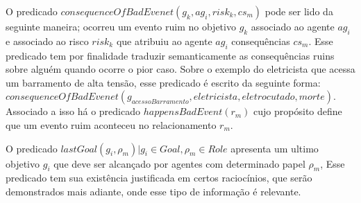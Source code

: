 O predicado $consequenceOfBadEvenet(g_k, ag_i,risk_k,cs_m)$ pode ser lido da seguinte maneira; ocorreu um evento ruim no 
objetivo $g_k$ associado ao agente $ag_i$ e associado ao risco $risk_k$ que atribuiu ao agente $ag_i$ consequências $cs_m$. Esse 
predicado tem por finalidade traduzir semanticamente as consequências ruins sobre alguém quando ocorre o pior caso. Sobre o exemplo 
do eletricista que acessa um barramento de alta tensão, esse predicado é escrito da seguinte forma: $consequenceOfBadEvenet(g_{acessoBarramento}, eletricista,eletrocutado,morte)$. Associado a isso há o predicado $happensBadEvent(r_m)$ cujo propósito define que um evento ruim aconteceu no relacionamento $r_m$.

O predicado $lastGoal(g_i,\rho_m) | g_i \in Goal, \rho_m \in Role $ apresenta um ultimo objetivo $g_i$ que deve ser alcançado 
por agentes com determinado papel $\rho_m$, Esse predicado tem sua existência justificada em certos raciocínios, que serão demonstrados 
mais adiante, onde esse tipo de informação é relevante.